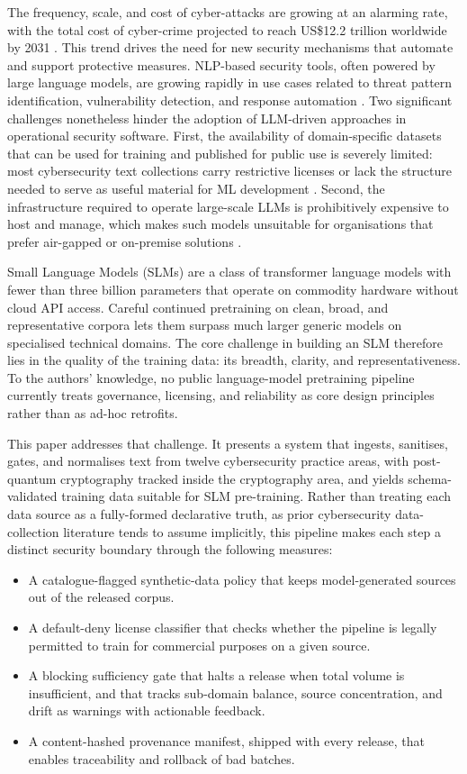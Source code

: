 \documentclass[conference]{IEEEtran}
\begin{document}
The frequency, scale, and cost of cyber-attacks are growing at an alarming rate, with the total cost of cyber-crime projected to reach US\$12.2 trillion worldwide by 2031 \cite{braue2025cybercrime}. This trend drives the need for new security mechanisms that automate and support protective measures. NLP-based security tools, often powered by large language models, are growing rapidly in use cases related to threat pattern identification, vulnerability detection, and response automation \cite{zhang2025llms, ferrag2024revolutionising}.
Two significant challenges nonetheless hinder the adoption of LLM-driven approaches in operational security software. First, the availability of domain-specific datasets that can be used for training and published for public use is severely limited: most cybersecurity text collections carry restrictive licenses or lack the structure needed to serve as useful material for ML development \cite{yu2025primus}. Second, the infrastructure required to operate large-scale LLMs is prohibitively expensive to host and manage, which makes such models unsuitable for organisations that prefer air-gapped or on-premise solutions \cite{minaee2024llm}.

Small Language Models (SLMs) are a class of transformer language models with fewer than three billion parameters \cite{minaee2024llm} that operate on commodity hardware without cloud API access. Careful continued pretraining on clean, broad, and representative corpora lets them surpass much larger generic models on specialised technical domains. The core challenge in building an SLM therefore lies in the quality of the training data: its breadth, clarity, and representativeness. To the authors' knowledge, no public language-model pretraining pipeline currently treats governance, licensing, and reliability as core design principles rather than as ad-hoc retrofits.

This paper addresses that challenge. It presents a system that ingests, sanitises, gates, and normalises text from twelve cybersecurity practice areas, with post-quantum cryptography tracked inside the cryptography area, and yields schema-validated training data suitable for SLM pre-training. Rather than treating each data source as a fully-formed declarative truth, as prior cybersecurity data-collection literature tends to assume implicitly, this pipeline makes each step a distinct security boundary through the following measures:
\vspace{\baselineskip}
\begin{itemize}
\item A catalogue-flagged synthetic-data policy that keeps
model-generated sources out of the released corpus.
\item A default-deny license classifier that checks whether the
pipeline is legally permitted to train for commercial
purposes on a given source.
\item A blocking sufficiency gate that halts a release when total
volume is insufficient, and that tracks sub-domain balance,
source concentration, and drift as warnings with actionable
feedback.
\item A content-hashed provenance manifest, shipped with
every release, that enables traceability and rollback of
bad batches.
\end{itemize}
\end{document}
